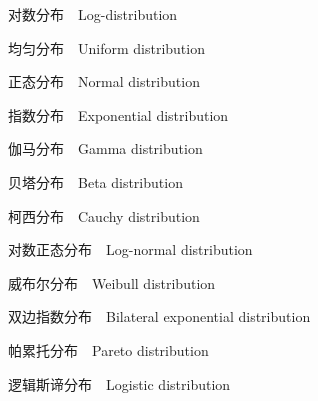 \begin{frame}{对数分布$\quad$Log-distribution}

\end{frame}

\begin{frame}{均匀分布$\quad$Uniform distribution}

\end{frame}

\begin{frame}{正态分布$\quad$Normal distribution}

\end{frame}

\begin{frame}{指数分布$\quad$Exponential distribution}

\end{frame}

\begin{frame}{伽马分布$\quad$Gamma distribution}

\end{frame}

\begin{frame}{贝塔分布$\quad$Beta distribution}

\end{frame}

\begin{frame}{柯西分布$\quad$Cauchy distribution}

\end{frame}

\begin{frame}{对数正态分布$\quad$Log-normal distribution}

\end{frame}

\begin{frame}{威布尔分布$\quad$Weibull distribution}

\end{frame}

\begin{frame}{双边指数分布$\quad$Bilateral exponential distribution}

\end{frame}

\begin{frame}{帕累托分布$\quad$Pareto distribution}

\end{frame}

\begin{frame}{逻辑斯谛分布$\quad$Logistic distribution}

\end{frame}

